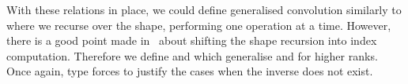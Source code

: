 With these relations in place, we could define generalised convolution
similarly to  where we recurse over the shape, performing one
operation at a time.  However, there is a good point made
in~\cite{cnn-array} about shifting the shape recursion into index computation.
Therefore we define  and  which generalise  and
 for higher ranks.  Once again,  type forces  to justify
the cases when the inverse does not exist.
\begin{mathpar}
\end{mathpar}
